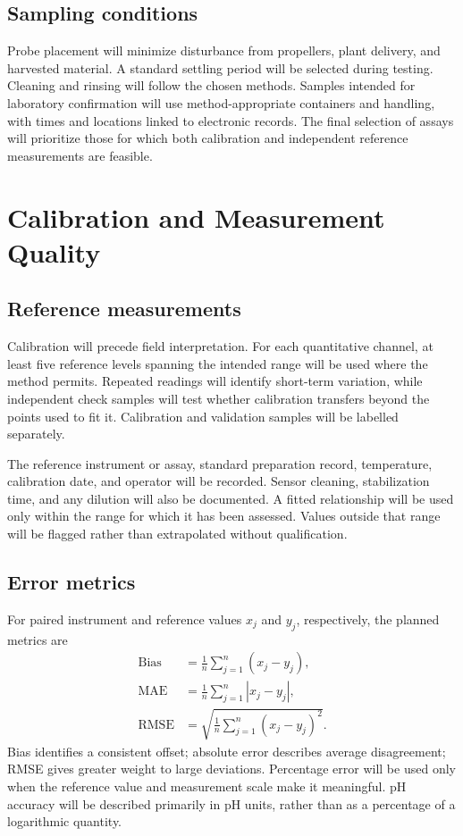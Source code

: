 \documentclass[12pt,a4paper]{article}
\newcommand{\papersection}[1]{\clearpage\section{#1}}
\begin{document}
\subsection{Sampling conditions}
Probe placement will minimize disturbance from propellers, plant delivery, and harvested material. A standard settling period will be selected during testing. Cleaning and rinsing will follow the chosen methods. Samples intended for laboratory confirmation will use method-appropriate containers and handling, with times and locations linked to electronic records. The final selection of assays will prioritize those for which both calibration and independent reference measurements are feasible.

\papersection{Calibration and Measurement Quality}
\subsection{Reference measurements}
Calibration will precede field interpretation. For each quantitative channel, at least five reference levels spanning the intended range will be used where the method permits. Repeated readings will identify short-term variation, while independent check samples will test whether calibration transfers beyond the points used to fit it. Calibration and validation samples will be labelled separately.

The reference instrument or assay, standard preparation record, temperature, calibration date, and operator will be recorded. Sensor cleaning, stabilization time, and any dilution will also be documented. A fitted relationship will be used only within the range for which it has been assessed. Values outside that range will be flagged rather than extrapolated without qualification.

\subsection{Error metrics}
For paired instrument and reference values $x_j$ and $y_j$, respectively, the planned metrics are
\begin{align}
\mathrm{Bias}&=\frac{1}{n}\sum_{j=1}^{n}(x_j-y_j),\\
\mathrm{MAE}&=\frac{1}{n}\sum_{j=1}^{n}|x_j-y_j|,\\
\mathrm{RMSE}&=\sqrt{\frac{1}{n}\sum_{j=1}^{n}(x_j-y_j)^2}.
\end{align}
Bias identifies a consistent offset; absolute error describes average disagreement; RMSE gives greater weight to large deviations. Percentage error will be used only when the reference value and measurement scale make it meaningful. pH accuracy will be described primarily in pH units, rather than as a percentage of a logarithmic quantity.
\end{document}
